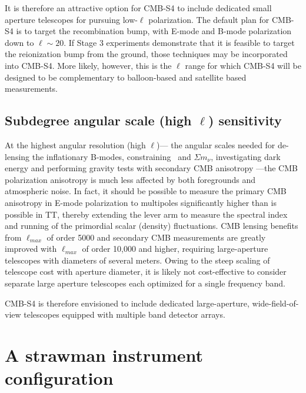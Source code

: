 It is therefore an attractive option for CMB-S4 to include dedicated small aperture telescopes for pursuing low-$\ell$ polarization. The default plan for CMB-S4 is to target the recombination bump, with E-mode and B-mode polarization down to $\ell \sim 20$. If Stage 3 experiments demonstrate that it is feasible to target the reionization bump from the ground, those techniques may be incorporated into CMB-S4. More likely, however, this is the $\ell$ range for which CMB-S4 will be designed to be complementary to balloon-based and satellite based measurements. 

\subsection{Subdegree angular scale (high $\ell$) sensitivity}

At the highest angular resolution (high $\ell$)--- the angular scales needed for de-lensing the inflationary B-modes, constraining \neff\ and $\Sigma m_\nu$,  investigating dark energy and performing gravity tests with secondary CMB  anisotropy ---the CMB polarization anisotropy is much less affected by both foregrounds and atmospheric noise. In fact, it should be possible to measure the primary CMB anisotropy in E-mode polarization to multipoles significantly higher than is possible in TT, thereby extending the lever arm to measure the spectral index and running of the primordial scalar (density) fluctuations. CMB lensing benefits from $\ell_{max}$ of order 5000 and secondary CMB measurements are greatly improved with $\ell_{max}$ of order 10,000 and higher, requiring large-aperture telescopes with diameters of several meters. Owing to the steep scaling of telescope cost with aperture diameter, it is likely not cost-effective to consider separate large aperture telescopes each optimized for a single frequency band. 

CMB-S4 is therefore envisioned to include dedicated large-aperture, wide-field-of-view telescopes equipped with multiple band detector arrays.

\section{A strawman instrument configuration}
\label{sec:strawman}


